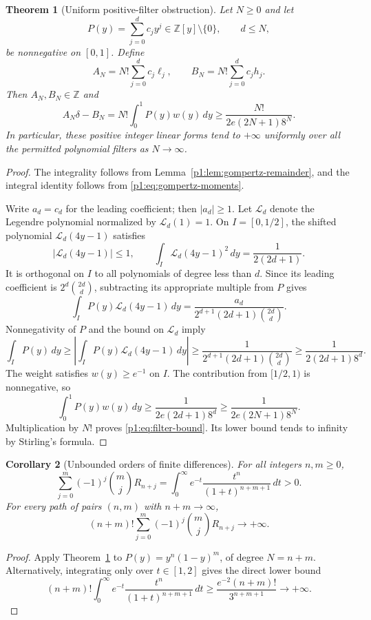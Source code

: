 \documentclass[11pt,a4paper]{article}
\newtheorem{theorem}{Theorem}[section]
\newtheorem{corollary}[theorem]{Corollary}
\theoremstyle{definition}
\theoremstyle{remark}
\numberwithin{equation}{section}
\begin{document}
\begin{theorem}[Uniform positive-filter obstruction]
\label{p1:thm:positive-filter}
Let $N\geq0$ and let
\[
 P(y)=\sum_{j=0}^d c_jy^j\in\mathbb Z[y]\setminus\{0\},
 \qquad d\leq N,
\]
be nonnegative on $[0,1]$. Define
\[
 A_N=N!\sum_{j=0}^dc_j\ell_j,
 \qquad
 B_N=N!\sum_{j=0}^dc_jh_j.
\]
Then $A_N,B_N\in\mathbb Z$ and
\begin{equation}\label{p1:eq:filter-bound}
 A_N\delta-B_N
 =N!\int_0^1P(y)w(y)\,dy
 \geq\frac{N!}{2e(2N+1)8^N}.
\end{equation}
In particular, these positive integer linear forms tend to $+\infty$
uniformly over all the permitted polynomial filters as $N\to\infty$.
\end{theorem}
\begin{proof}
The integrality follows from Lemma~\ref{p1:lem:gompertz-remainder}, and
the integral identity follows from \eqref{p1:eq:gompertz-moments}.

Write $a_d=c_d$ for the leading coefficient; then $|a_d|\geq1$.
Let $\mathcal L_d$ denote the Legendre polynomial normalized by
$\mathcal L_d(1)=1$. On $I=[0,1/2]$, the shifted polynomial
$\mathcal L_d(4y-1)$ satisfies
\[
 |\mathcal L_d(4y-1)|\leq1,
 \qquad
 \int_I\mathcal L_d(4y-1)^2\,dy=\frac1{2(2d+1)}.
\]
It is orthogonal on $I$ to all polynomials of degree less than $d$.
Since its leading coefficient is
$2^d\binom{2d}{d}$, subtracting its appropriate multiple from $P$
gives
\[
 \int_I P(y)\mathcal L_d(4y-1)\,dy
 =\frac{a_d}{2^{d+1}(2d+1)\binom{2d}{d}}.
\]
Nonnegativity of $P$ and the bound on $\mathcal L_d$ imply
\[
 \int_I P(y)\,dy
 \geq\left|\int_I P(y)\mathcal L_d(4y-1)\,dy\right|
 \geq\frac1{2^{d+1}(2d+1)\binom{2d}{d}}
 \geq\frac1{2(2d+1)8^d}.
\]
The weight satisfies $w(y)\geq e^{-1}$ on $I$. The contribution from
$[1/2,1)$ is nonnegative, so
\[
 \int_0^1P(y)w(y)\,dy
 \geq\frac1{2e(2d+1)8^d}
 \geq\frac1{2e(2N+1)8^N}.
\]
Multiplication by $N!$ proves \eqref{p1:eq:filter-bound}. Its lower bound
tends to infinity by Stirling's formula.
\end{proof}

\begin{corollary}[Unbounded orders of finite differences]
\label{p1:cor:finite-difference-barrier}
For all integers $n,m\geq0$,
\[
 \sum_{j=0}^m(-1)^j\binom mj R_{n+j}
 =\int_0^\infty e^{-t}
       \frac{t^n}{(1+t)^{n+m+1}}\,dt>0.
\]
For every path of pairs $(n,m)$ with $n+m\to\infty$,
\[
 (n+m)!\sum_{j=0}^m(-1)^j\binom mj R_{n+j}
 \longrightarrow+\infty.
\]
\end{corollary}
\begin{proof}
Apply Theorem~\ref{p1:thm:positive-filter} to
$P(y)=y^n(1-y)^m$, of degree $N=n+m$. Alternatively, integrating only
over $t\in[1,2]$ gives the direct lower bound
\[
 (n+m)!\int_0^\infty e^{-t}
       \frac{t^n}{(1+t)^{n+m+1}}\,dt
 \geq\frac{e^{-2}(n+m)!}{3^{n+m+1}}\longrightarrow+\infty.
\]
\end{proof}
\end{document}

